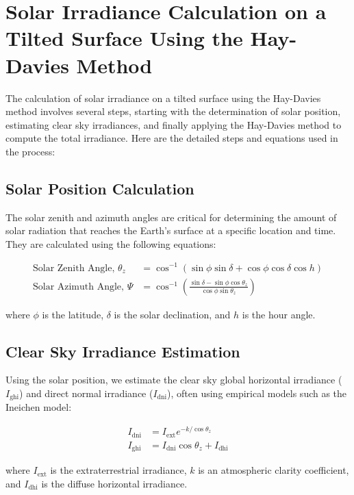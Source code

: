 \section*{Solar Irradiance Calculation on a Tilted Surface Using the Hay-Davies Method}

The calculation of solar irradiance on a tilted surface using the Hay-Davies method involves several steps, starting with the determination of solar position, estimating clear sky irradiances, and finally applying the Hay-Davies method to compute the total irradiance. Here are the detailed steps and equations used in the process:

\subsection*{Solar Position Calculation}
The solar zenith and azimuth angles are critical for determining the amount of solar radiation that reaches the Earth's surface at a specific location and time. They are calculated using the following equations:

\begin{align}
\text{Solar Zenith Angle, } \theta_z &= \cos^{-1}(\sin \phi \sin \delta + \cos \phi \cos \delta \cos h) \\
\text{Solar Azimuth Angle, } \Psi &= \cos^{-1}\left(\frac{\sin \delta - \sin \phi \cos \theta_z}{\cos \phi \sin \theta_z}\right)
\end{align}

where $\phi$ is the latitude, $\delta$ is the solar declination, and $h$ is the hour angle.

\subsection*{Clear Sky Irradiance Estimation}
Using the solar position, we estimate the clear sky global horizontal irradiance ($I_{\text{ghi}}$) and direct normal irradiance ($I_{\text{dni}}$), often using empirical models such as the Ineichen model:

\begin{align}
I_{\text{dni}} &= I_{\text{ext}} e^{-k / \cos \theta_z} \\
I_{\text{ghi}} &= I_{\text{dni}} \cos \theta_z + I_{\text{dhi}}
\end{align}

where $I_{\text{ext}}$ is the extraterrestrial irradiance, $k$ is an atmospheric clarity coefficient, and $I_{\text{dhi}}$ is the diffuse horizontal irradiance.

